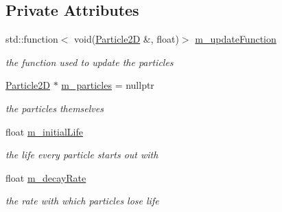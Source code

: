 \subsection*{Private Attributes}
\begin{DoxyCompactItemize}
\item 
\mbox{\label{classnta_1_1ParticleBatch2D_abfe8d182f35c8eb0f882902d292129be}} 
std\+::function$<$ void(\hyperlink{structnta_1_1Particle2D}{Particle2D} \&, float)$>$ \hyperlink{classnta_1_1ParticleBatch2D_abfe8d182f35c8eb0f882902d292129be}{m\+\_\+update\+Function}
\begin{DoxyCompactList}\small\item\em the function used to update the particles \end{DoxyCompactList}\item 
\mbox{\label{classnta_1_1ParticleBatch2D_ad410f47c5312b018125795882db9aa6c}} 
\hyperlink{structnta_1_1Particle2D}{Particle2D} $\ast$ \hyperlink{classnta_1_1ParticleBatch2D_ad410f47c5312b018125795882db9aa6c}{m\+\_\+particles} = nullptr
\begin{DoxyCompactList}\small\item\em the particles themselves \end{DoxyCompactList}\item 
\mbox{\label{classnta_1_1ParticleBatch2D_a9c789bf8a6449ed7db554cee6f3c918e}} 
float \hyperlink{classnta_1_1ParticleBatch2D_a9c789bf8a6449ed7db554cee6f3c918e}{m\+\_\+initial\+Life}
\begin{DoxyCompactList}\small\item\em the life every particle starts out with \end{DoxyCompactList}\item 
\mbox{\label{classnta_1_1ParticleBatch2D_a59d0ca59a6f1c83d7a2c7c210e87bcc1}} 
float \hyperlink{classnta_1_1ParticleBatch2D_a59d0ca59a6f1c83d7a2c7c210e87bcc1}{m\+\_\+decay\+Rate}
\begin{DoxyCompactList}\small\item\em the rate with which particles lose life \end{DoxyCompactList}\item 
\mbox{\label{classnta_1_1ParticleBatch2D_ac564b88da2f73d5692cbdec15478fe4d}} 

\end{DoxyCompactItemize}
